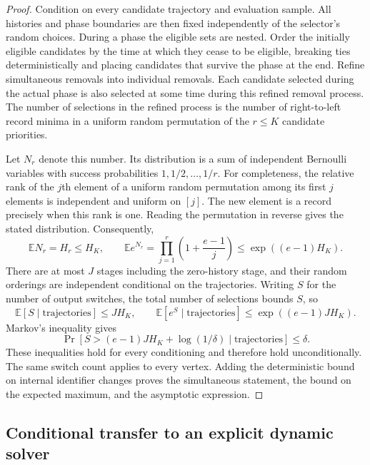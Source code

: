 \documentclass[11pt]{article}
\begin{document}
\begin{proof}
Condition on every candidate trajectory and evaluation sample. All
histories and phase boundaries are then fixed independently of the
selector's random choices. During a phase the eligible sets are nested.
Order the initially eligible candidates by the time at which they cease
to be eligible, breaking ties deterministically and placing candidates
that survive the phase at the end. Refine simultaneous removals into
individual removals. Each candidate selected during the actual phase
is also selected at some time during this refined removal process.
The number of selections in the refined process is the number of
right-to-left record minima in a uniform random permutation of the
$r\le K$ candidate priorities.

Let $N_r$ denote this number. Its distribution is a sum of independent
Bernoulli variables with success probabilities $1,1/2,\ldots,1/r$.
For completeness, the relative rank of the $j$th element of a uniform
random permutation among its first $j$ elements is independent and
uniform on $[j]$. The new element is a record precisely when this rank
is one. Reading the permutation in reverse gives the stated distribution.
Consequently,
\[
 \mathbb E N_r=H_r\le H_K,
 \qquad
 \mathbb E e^{N_r}
 =\prod_{j=1}^r\left(1+\frac{e-1}{j}\right)
 \le\exp((e-1)H_K).
\]
There are at most $J$ stages including the zero-history stage, and their
random orderings are independent conditional on the trajectories.
Writing $S$ for the number of output switches, the total number of
selections bounds $S$, so
\[
 \mathbb E[S\mid\text{trajectories}]\le JH_K,
 \qquad
 \mathbb E[e^S\mid\text{trajectories}]
 \le\exp((e-1)JH_K).
\]
Markov's inequality gives
\[
 \Pr[S>(e-1)JH_K+\log(1/\delta)
        \mid\text{trajectories}]\le\delta.
\]
These inequalities hold for every conditioning and therefore hold
unconditionally. The same switch count applies to every vertex. Adding
the deterministic bound on internal identifier changes proves the
simultaneous statement, the bound on the expected maximum, and the
asymptotic expression.
\end{proof}

\subsection{Conditional transfer to an explicit dynamic solver}
\label{sec:conditional}
\end{document}
